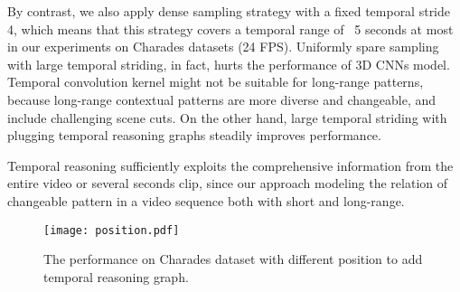 \documentclass[conference,compsoc]{IEEEtran}
\begin{document}
    By contrast, we also apply dense sampling strategy with a fixed temporal stride 4, which means that this strategy covers a temporal range of ~5 seconds at most in our experiments on Charades datasets (24 FPS). Uniformly spare sampling with large temporal striding, in fact, hurts the performance of 3D CNNs model. Temporal convolution kernel might not be suitable for long-range patterns, because long-range contextual patterns are more diverse and changeable, and include challenging scene cuts. On the other hand, large temporal striding with plugging temporal reasoning graphs steadily improves performance.
    
    Temporal reasoning sufficiently exploits the comprehensive information from the entire video or several seconds clip, since our approach modeling the relation of changeable pattern in a video sequence both with short and long-range.
    
    \begin{figure}[ht]
    \centering
    \texttt{[image: position.pdf]}
    \caption{The performance on Charades dataset with different position to add temporal reasoning graph.}
    \label{fig:stage}
    \end{figure}
    
\end{document}
